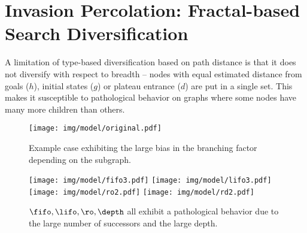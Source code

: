 
\chapter[Invasion Percolation]{Invasion Percolation: Fractal-based Search Diversification}

\label{chap:ip}

A limitation of  type-based diversification based on path distance %
is that it does not diversify with respect to breadth -- 
nodes with equal estimated distance from goals ($h$), initial states ($g$) or plateau entrance ($d$) are put in a single set.
This makes it susceptible to pathological behavior on graphs where some nodes have many more children than others.

\begin{figure}[hbtp]
 \centering
 \texttt{[image: img/model/original.pdf]}
 \caption{Example case exhibiting the large bias in the branching factor depending on the subgraph.}
 \label{fig:model}
\end{figure}

\begin{figure}[hbtp]
 \centering
 \texttt{[image: img/model/fifo3.pdf]}
 \texttt{[image: img/model/lifo3.pdf]}\\
 \texttt{[image: img/model/ro2.pdf]}
 \texttt{[image: img/model/rd2.pdf]}
 \caption{$\fifo,\lifo,\ro,\depth$ all exhibit a pathological behavior due to the large number of successors and the large depth.}
 \label{fig:model-pathological}
\end{figure}

